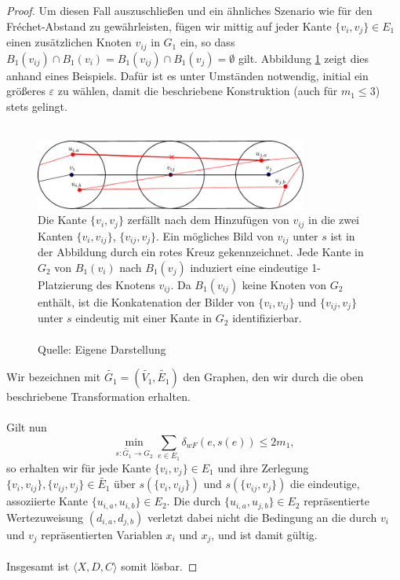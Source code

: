 \documentclass[a4paper, 12pt, twoside]{article}
\theoremstyle{Format1} %
\begin{document}
\begin{proof}
Um diesen Fall auszuschließen und ein ähnliches Szenario wie für den Fréchet-Abstand zu gewährleisten, fügen wir mittig auf jeder Kante $\{v_i, v_j\} \in E_1$
einen zusätzlichen Knoten $v_{ij}$ in $G_1$ ein, so dass $B_1(v_{ij}) \cap B_1(v_i) = B_1(v_{ij}) \cap B_1(v_j) = \emptyset$ gilt. Abbildung \ref{fig:chapter_4_example_1}
zeigt dies anhand eines Beispiels.
Dafür ist es unter Umständen notwendig, initial ein größeres $\varepsilon$ zu wählen, damit die beschriebene Konstruktion (auch für $m_1 \leq 3$) stets gelingt.
\\
\\
\begin{figure}[H]
    \centering
    \includegraphics[width=0.8\textwidth]{chapter_4_example_1.pdf}
    \caption{
	Die Kante $\{v_i, v_j\}$ zerfällt nach dem Hinzufügen von $v_{ij}$ in die zwei Kanten $\{v_i, v_{ij}\}$, $\{v_{ij},v_j\}$.
	Ein mögliches Bild von $v_{ij}$ unter $s$ ist in der Abbildung durch ein rotes Kreuz gekennzeichnet.
	Jede Kante in $G_2$ von $B_1(v_i)$ nach $B_1(v_j)$ induziert eine eindeutige 1-Platzierung
	des Knotens $v_{ij}$. Da $B_1(v_{ij})$ keine Knoten von $G_2$ enthält, ist die Konkatenation der Bilder von $\{v_i,v_{ij}\}$ und $\{v_{ij},v_j\}$
	unter $s$ eindeutig mit einer Kante in $G_2$ identifizierbar.
	\\
	\\
	Quelle: Eigene Darstellung
	}
    \label{fig:chapter_4_example_1}
\end{figure}

Wir bezeichnen mit $\tilde{G_1}=(\tilde{V_1}, \tilde{E_1})$ den Graphen, den wir durch die oben beschriebene Transformation erhalten.
\\
\\
Gilt nun
$$ \min_{s: \tilde{G_1} \to G_2} \sum_{e \in E_1} \delta_{wF}(e, s(e)) \leq 2m_1, $$
so erhalten wir für jede Kante $\{v_i, v_j\} \in E_1$ und ihre Zerlegung $\{v_i, v_{ij}\},\{v_{ij}, v_j\} \in \tilde{E_1}$
über $s(\{v_i, v_{ij}\})$ und $s(\{v_{ij}, v_j\})$ die eindeutige, assoziierte Kante $\{u_{i,a}, u_{i,b}\} \in E_2$.
Die durch $\{u_{i,a}, u_{j,b}\} \in E_2$ repräsentierte Wertezuweisung $(d_{i,a}, d_{j,b})$ verletzt dabei nicht die Bedingung an die
durch $v_i$ und $v_j$ repräsentierten Variablen $x_i$ und $x_j$, und ist damit gültig.
\\
\\
Insgesamt ist $\langle X,D,C \rangle$ somit lösbar.
\end{proof}
\end{document}
